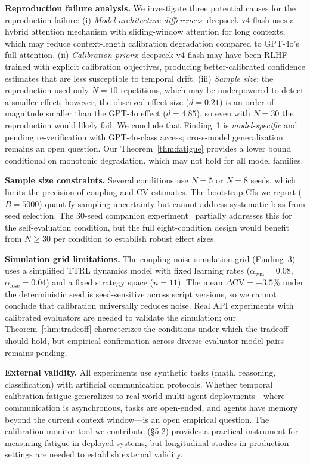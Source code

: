 \documentclass[11pt]{article}
\newcommand{\CV}{\ensuremath{\mathrm{CV}}}
\theoremstyle{definition}
\theoremstyle{remark}
\begin{document}
\textbf{Reproduction failure analysis.} We investigate three potential causes for the reproduction failure: (i) \textit{Model architecture differences}: deepseek-v4-flash uses a hybrid attention mechanism with sliding-window attention for long contexts, which may reduce context-length calibration degradation compared to GPT-4o's full attention. (ii) \textit{Calibration priors}: deepseek-v4-flash may have been RLHF-trained with explicit calibration objectives, producing better-calibrated confidence estimates that are less susceptible to temporal drift. (iii) \textit{Sample size}: the reproduction used only $N{=}10$ repetitions, which may be underpowered to detect a smaller effect; however, the observed effect size ($d = 0.21$) is an order of magnitude smaller than the GPT-4o effect ($d = 4.85$), so even with $N{=}30$ the reproduction would likely fail. We conclude that Finding~1 is \textit{model-specific} and pending re-verification with GPT-4o-class access; cross-model generalization remains an open question. Our Theorem~\ref{thm:fatigue} provides a lower bound conditional on monotonic degradation, which may not hold for all model families.

\textbf{Sample size constraints.} Several conditions use $N{=}5$ or $N{=}8$ seeds, which limits the precision of coupling and CV estimates. The bootstrap CIs we report ($B{=}5000$) quantify sampling uncertainty but cannot address systematic bias from seed selection. The 30-seed companion experiment~\citep{companion2026} partially addresses this for the self-evaluation condition, but the full eight-condition design would benefit from $N{\geq}30$ per condition to establish robust effect sizes.

\textbf{Simulation grid limitations.} The coupling-noise simulation grid (Finding~3) uses a simplified TTRL dynamics model with fixed learning rates ($\alpha_{\text{win}}{=}0.08$, $\alpha_{\text{lose}}{=}0.04$) and a fixed strategy space ($n{=}11$). The mean $\Delta\CV{=}-3.5\%$ under the deterministic seed is seed-sensitive across script versions, so we cannot conclude that calibration universally reduces noise. Real API experiments with calibrated evaluators are needed to validate the simulation; our Theorem~\ref{thm:tradeoff} characterizes the conditions under which the tradeoff should hold, but empirical confirmation across diverse evaluator-model pairs remains pending.

\textbf{External validity.} All experiments use synthetic tasks (math, reasoning, classification) with artificial communication protocols. Whether temporal calibration fatigue generalizes to real-world multi-agent deployments---where communication is asynchronous, tasks are open-ended, and agents have memory beyond the current context window---is an open empirical question. The calibration monitor tool we contribute (\S5.2) provides a practical instrument for measuring fatigue in deployed systems, but longitudinal studies in production settings are needed to establish external validity.
\end{document}
